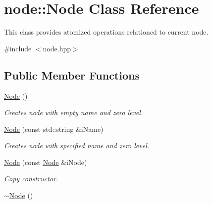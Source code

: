 \hypertarget{classnode_1_1Node}{\section{node\-:\-:Node Class Reference}
\label{classnode_1_1Node}
}


This class provides atomized operations relationed to current node.  




{\ttfamily \#include $<$node.\-hpp$>$}

\subsection*{Public Member Functions}
\begin{DoxyCompactItemize}
\item 
\hypertarget{classnode_1_1Node_a5caad933e458d07b106592c3adc57376}{\hyperlink{classnode_1_1Node_a5caad933e458d07b106592c3adc57376}{Node} ()}\label{classnode_1_1Node_a5caad933e458d07b106592c3adc57376}

\begin{DoxyCompactList}\small\item\em Creates node with empty name and zero level. \end{DoxyCompactList}\item 
\hyperlink{classnode_1_1Node_a8ed9e1fe9979ed9fefa4596a7d3f9098}{Node} (const std\-::string \&i\-Name)
\begin{DoxyCompactList}\small\item\em Creates node with specified name and zero level. \end{DoxyCompactList}\item 
\hyperlink{classnode_1_1Node_a214bbdde99347bda1d92a4b9ebee421c}{Node} (const \hyperlink{classnode_1_1Node}{Node} \&i\-Node)
\begin{DoxyCompactList}\small\item\em Copy constructor. \end{DoxyCompactList}\item 
\hypertarget{classnode_1_1Node_a4594558bd19fa4633a0ec277950c281f}{\hyperlink{classnode_1_1Node_a4594558bd19fa4633a0ec277950c281f}{$\sim$\-Node} ()}\label{classnode_1_1Node_a4594558bd19fa4633a0ec277950c281f}


\end{DoxyCompactItemize}

